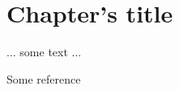 
\chapter{Chapter's title}
\label{sec:chapter2}

... some text ...

Some reference~\cite{Led2004}


